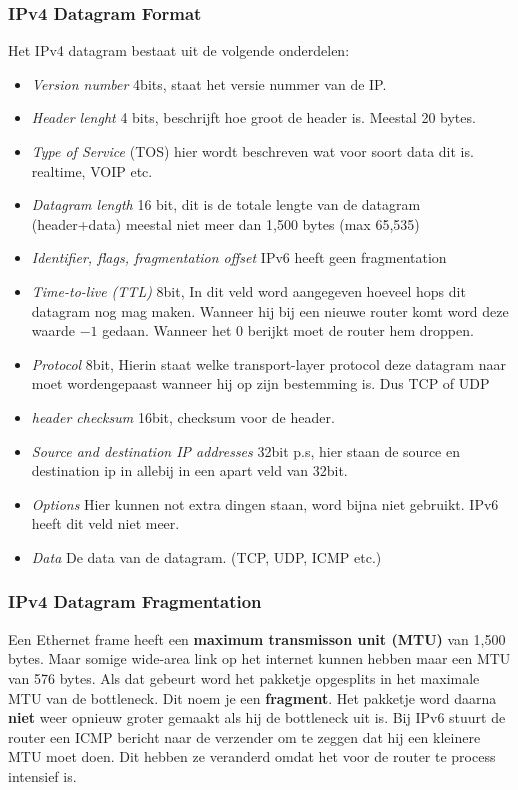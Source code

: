 \subsubsection{IPv4 Datagram Format}
Het IPv4 datagram bestaat uit de volgende onderdelen:
\begin{itemize}
    \item \textit{Version number} 4bits, staat het versie nummer van de IP.
    \item \textit{Header lenght} 4 bits, beschrijft hoe groot de header is. Meestal 20 bytes.
    \item \textit{Type of Service} (TOS) hier wordt beschreven wat voor soort data dit is. realtime, VOIP etc.
    \item \textit{Datagram length} 16 bit, dit is de totale lengte van de datagram (header+data) meestal niet meer dan 1,500 bytes (max 65,535)
    \item \textit{Identifier, flags, fragmentation offset} IPv6 heeft geen fragmentation
    \item \textit{Time-to-live (TTL)} 8bit, In dit veld word aangegeven hoeveel hops dit datagram nog mag maken. Wanneer hij bij een nieuwe router komt word deze waarde $-1$ gedaan. Wanneer het $0$ berijkt moet de router hem droppen.
    \item \textit{Protocol} 8bit, Hierin staat welke transport-layer protocol deze datagram naar moet wordengepaast wanneer hij op zijn bestemming is. Dus TCP of UDP
    \item \textit{header checksum} 16bit, checksum voor de header.
    \item \textit{Source and destination IP addresses} 32bit p.s, hier staan de source en destination ip in allebij in een apart veld van 32bit.
    \item \textit{Options} Hier kunnen not extra dingen staan, word bijna niet gebruikt. IPv6 heeft dit veld niet meer.
    \item \textit{Data} De data van de datagram. (TCP, UDP, ICMP etc.)
\end{itemize}

\subsubsection{IPv4 Datagram Fragmentation}
Een Ethernet frame heeft een \textbf{maximum transmisson unit (MTU)} van 1,500 bytes. Maar somige wide-area link op
het internet kunnen hebben maar een MTU van 576 bytes. Als dat gebeurt word het pakketje opgesplits in het maximale
MTU van de bottleneck. Dit noem je een \textbf{fragment}. Het pakketje word daarna \textbf{niet} weer opnieuw groter
gemaakt als hij de bottleneck uit is. Bij IPv6 stuurt de router een ICMP bericht naar de verzender om te zeggen dat
hij een kleinere MTU moet doen. Dit hebben ze veranderd omdat het voor de router te process intensief is.

